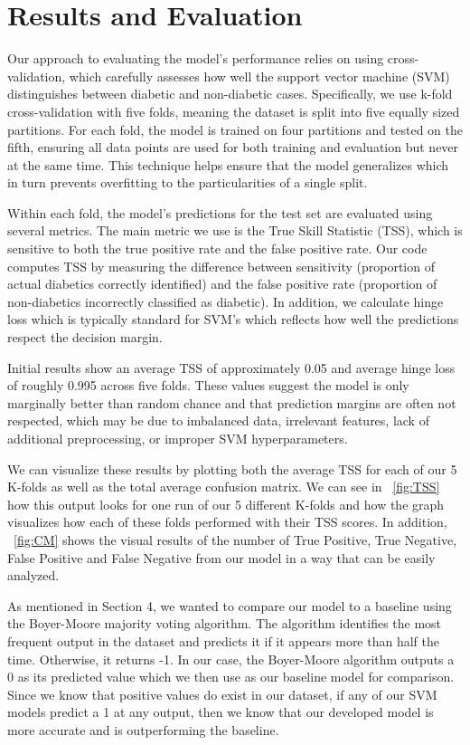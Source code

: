 \documentclass[11pt]{article}
\begin{document}
\section{Results and Evaluation}

Our approach to evaluating the model’s performance relies on using cross-validation, which carefully assesses how well the support vector machine (SVM) distinguishes between diabetic and non-diabetic cases. Specifically, we use k-fold cross-validation with five folds, meaning the dataset is split into five equally sized partitions. For each fold, the model is trained on four partitions and tested on the fifth, ensuring all data points are used for both training and evaluation but never at the same time. This technique helps ensure that the model generalizes which in turn prevents overfitting to the particularities of a single split.

Within each fold, the model’s predictions for the test set are evaluated using several metrics. The main metric we use is the True Skill Statistic (TSS), which is sensitive to both the true positive rate and the false positive rate. Our code computes TSS by measuring the difference between sensitivity (proportion of actual diabetics correctly identified) and the false positive rate (proportion of non-diabetics incorrectly classified as diabetic). In addition, we calculate hinge loss which is typically standard for SVM's which reflects how well the predictions respect the decision margin.

Initial results show an average TSS of approximately 0.05 and average hinge loss of roughly 0.995 across five folds. These values suggest the model is only marginally better than random chance and that prediction margins are often not respected, which may be due to imbalanced data, irrelevant features, lack of additional preprocessing, or improper SVM hyperparameters.

We can visualize these results by plotting both the average TSS for each of our 5 K-folds as well as the total average confusion matrix. We can see in ~\ref{fig:TSS} how this output looks for one run of our 5 different K-folds and how the graph visualizes how each of these folds performed with their TSS scores. In addition, ~\ref{fig:CM} shows the visual results of the number of True Positive, True Negative, False Positive and False Negative from our model in a way that can be easily analyzed.

As mentioned in Section 4, we wanted to compare our model to a baseline using the Boyer-Moore majority voting algorithm. The algorithm identifies the most frequent output in the dataset and predicts it if it appears more than half the time. Otherwise, it returns -1. In our case, the Boyer-Moore algorithm outputs a 0 as its predicted value which we then use as our baseline model for comparison. Since we know that positive values do exist in our dataset, if any of our SVM models predict a 1 at any output, then we know that our developed model is more accurate and is outperforming the baseline.
\end{document}
